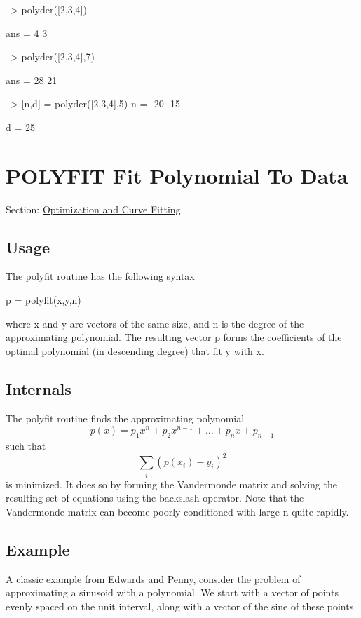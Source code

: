 \begin{DoxyVerbInclude}
--> polyder([2,3,4])

ans = 
 4 3 
\end{DoxyVerbInclude}



\begin{DoxyVerbInclude}
--> polyder([2,3,4],7)

ans = 
 28 21 
\end{DoxyVerbInclude}



\begin{DoxyVerbInclude}
--> [n,d] = polyder([2,3,4],5)
n = 
 -20 -15 

d = 
 25 
\end{DoxyVerbInclude}
 \hypertarget{curvefit_polyfit}{}\section{P\-O\-L\-Y\-F\-I\-T Fit Polynomial To Data}\label{curvefit_polyfit}
Section\-: \hyperlink{sec_curvefit}{Optimization and Curve Fitting} \hypertarget{vtkwidgets_vtkxyplotwidget_Usage}{}\subsection{Usage}\label{vtkwidgets_vtkxyplotwidget_Usage}
The {\ttfamily polyfit} routine has the following syntax \begin{DoxyVerb}  p = polyfit(x,y,n)
\end{DoxyVerb}
 where {\ttfamily x} and {\ttfamily y} are vectors of the same size, and {\ttfamily n} is the degree of the approximating polynomial. The resulting vector {\ttfamily p} forms the coefficients of the optimal polynomial (in descending degree) that fit {\ttfamily y} with {\ttfamily x}. \hypertarget{transforms_svd_Function}{}\subsection{Internals}\label{transforms_svd_Function}
The {\ttfamily polyfit} routine finds the approximating polynomial \[ p(x) = p_1 x^n + p_2 x^{n-1} + \dots + p_n x + p_{n+1} \] such that \[ \sum_{i} (p(x_i) - y_i)^2 \] is minimized. It does so by forming the Vandermonde matrix and solving the resulting set of equations using the backslash operator. Note that the Vandermonde matrix can become poorly conditioned with large {\ttfamily n} quite rapidly. \hypertarget{variables_struct_Example}{}\subsection{Example}\label{variables_struct_Example}
A classic example from Edwards and Penny, consider the problem of approximating a sinusoid with a polynomial. We start with a vector of points evenly spaced on the unit interval, along with a vector of the sine of these points.


